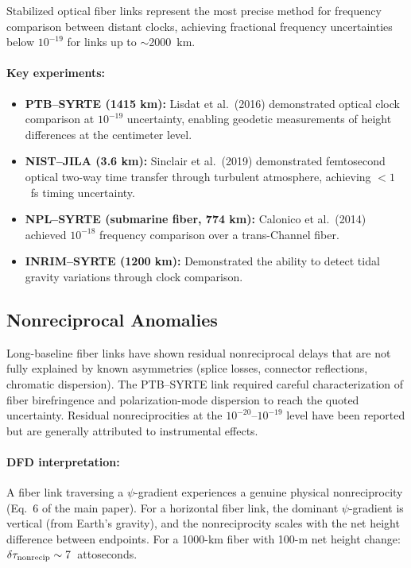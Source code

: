 \documentclass[12pt,letterpaper]{article}
\begin{document}
Stabilized optical fiber links represent the most precise method for
frequency comparison between distant clocks, achieving fractional frequency
uncertainties below $10^{-19}$ for links up to $\sim$2000~km.

\paragraph{Key experiments:}
\begin{itemize}
\item \textbf{PTB--SYRTE (1415 km):} Lisdat et al.\ (2016) demonstrated
optical clock comparison at $10^{-19}$ uncertainty, enabling geodetic
measurements of height differences at the centimeter level.
\item \textbf{NIST--JILA (3.6 km):} Sinclair et al.\ (2019) demonstrated
femtosecond optical two-way time transfer through turbulent atmosphere,
achieving $< 1$~fs timing uncertainty.
\item \textbf{NPL--SYRTE (submarine fiber, 774 km):} Calonico et al.\
(2014) achieved $10^{-18}$ frequency comparison over a trans-Channel fiber.
\item \textbf{INRIM--SYRTE (1200 km):} Demonstrated the ability to
detect tidal gravity variations through clock comparison.
\end{itemize}

\subsection{Nonreciprocal Anomalies}

Long-baseline fiber links have shown residual nonreciprocal delays that
are not fully explained by known asymmetries (splice losses, connector
reflections, chromatic dispersion). The PTB--SYRTE link required careful
characterization of fiber birefringence and polarization-mode dispersion to
reach the quoted uncertainty. Residual nonreciprocities at the
$10^{-20}$--$10^{-19}$ level have been reported but are generally
attributed to instrumental effects.

\paragraph{DFD interpretation:}
A fiber link traversing a $\psi$-gradient experiences a genuine physical
nonreciprocity (Eq.~6 of the main paper). For a horizontal fiber link,
the dominant $\psi$-gradient is vertical (from Earth's gravity), and the
nonreciprocity scales with the net height difference between endpoints.
For a 1000-km fiber with 100-m net height change:
$\delta\tau_{\rm nonrecip} \sim 7$~attoseconds.
\end{document}
